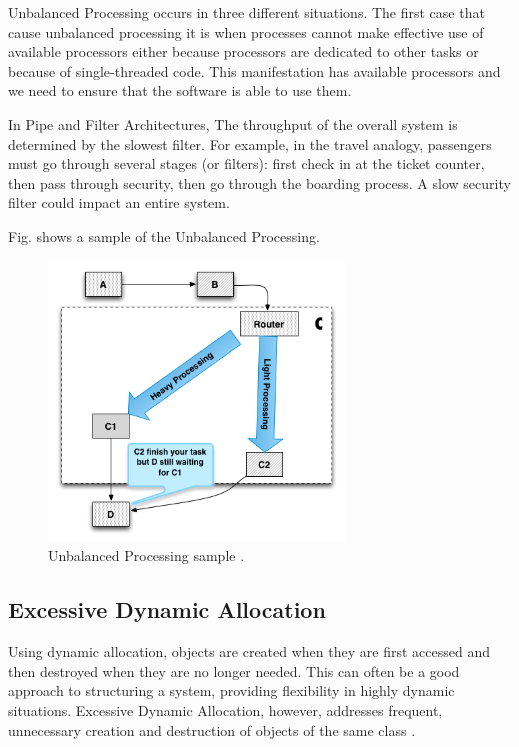 \documentclass[review]{elsarticle}
\begin{document}
Unbalanced Processing occurs in three different situations. The first case that cause unbalanced processing it is when processes cannot make effective use of available processors either because processors are dedicated to other tasks or because of single-threaded code. This manifestation has available processors and we need to ensure that the software is able to use them. 


In Pipe and Filter Architectures, The throughput of the overall system is determined by the slowest filter. For example, in the travel analogy, passengers must go through several stages (or filters): first check in at the ticket counter, then pass through security, then go through the boarding process. A slow security filter could impact an entire system. 


Fig.  shows a sample of the Unbalanced Processing. 

\begin{figure}[h]
\centering
\includegraphics[width=0.7\textwidth]{./images/unbalanced.png}
\caption{Unbalanced Processing sample \cite{Wert2013a}. }
\label{fig:unbalanced}
\end{figure}



\subsection{Excessive Dynamic Allocation}

Using dynamic allocation, objects are created when they are first accessed and then destroyed when they are no longer needed. This can often be a good approach to structuring a system, providing flexibility in highly dynamic situations. Excessive Dynamic Allocation, however, addresses frequent, unnecessary creation and destruction of objects of the same class \cite{Smith2002}.
\end{document}
